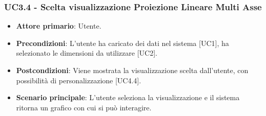 \subsubsection{UC3.4 - Scelta visualizzazione Proiezione Lineare Multi Asse}

\begin{itemize}
	\item \textbf{Attore primario}: Utente.
	\item \textbf{Precondizioni}: L'utente ha caricato dei dati nel sistema [UC1], ha selezionato le dimensioni da utilizzare [UC2].
	\item \textbf{Postcondizioni}: Viene mostrata la visualizzazione  scelta dall'utente, con possibilità di personalizzazione [UC4.4].
	\item \textbf{Scenario principale}: L'utente seleziona la visualizzazione  e il sistema ritorna un grafico con cui si può interagire.
\end{itemize}